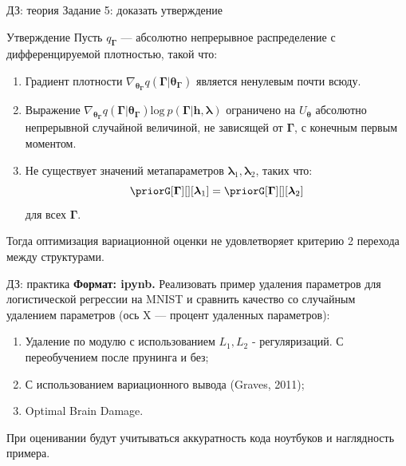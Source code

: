 \documentclass[10pt,pdf,utf8,russian,aspectratio=169]{beamer}
\begin{document}
\begin{frame}{ДЗ: теория}
Задание 5: доказать утверждение
\begin{block}{Утверждение}
Пусть $q_{\boldsymbol{\Gamma}}$ --- абсолютно непрерывное распределение с дифференцируемой плотностью, такой что:
\begin{enumerate}
\item Градиент плотности $\nabla_{\boldsymbol{\theta}_{\boldsymbol{\Gamma}}} q(\boldsymbol{\Gamma}|\boldsymbol{\theta}_{\boldsymbol{\Gamma}})$ является ненулевым почти всюду.
\item Выражение $\nabla_{\boldsymbol{\theta}_{\boldsymbol{\Gamma}}} q(\boldsymbol{\Gamma}|\boldsymbol{\theta}_{\boldsymbol{\Gamma}}) \text{log}~p(\boldsymbol{\Gamma}|\mathbf{h}, \boldsymbol{\lambda})$ ограничено на $U_{\boldsymbol{\theta}}$ абсолютно непрерывной случайной величиной, не зависящей от $\boldsymbol{\Gamma}$, с конечным первым моментом.
\item Не существует значений метапараметров $\boldsymbol{\lambda}_1, \boldsymbol{\lambda}_2$, таких что:
\[
    \priorG[\boldsymbol{\Gamma}][][\lam_1] =  \priorG[\boldsymbol{\Gamma}][][\lam_2]  
\]
для всех $\boldsymbol{\Gamma}$.
\end{enumerate}

Тогда оптимизация вариационной оценки не удовлетворяет критерию 2 перехода между структурами.

\end{block}
\end{frame}

\begin{frame}{ДЗ: практика}
\textbf{Формат: ipynb.}
Реализовать пример удаления параметров для логистической регрессии на MNIST и сравнить качество со случайным удалением параметров (ось X --- процент удаленных параметров):
\begin{enumerate}
\item Удаление по модулю с использованием $L_1, L_2$ - регуляризаций. С переобучением после прунинга и без;

\item С использованием вариационного вывода (Graves, 2011);

\item Optimal Brain Damage.
\end{enumerate}

При оценивании будут учитываться аккуратность кода ноутбуков и наглядность примера.\\~\\
\end{frame}
\end{document}
